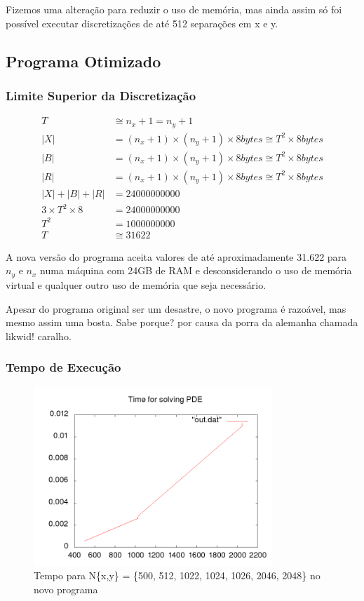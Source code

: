 \documentclass[12pt]{article}
\begin{document}
	Fizemos uma alteração para reduzir o uso de memória, mas ainda assim só foi possível executar discretizações de até 512 separações em x e y.
	
	\subsection{Programa Otimizado}
	\subsubsection{Limite Superior da Discretização}

	\begin{align}
		T &\cong n_x + 1 = n_y + 1 \\
		|X| &= (n_x+1)\times(n_y+1)\times8 bytes \cong T^2\times8 bytes \\
		|B| &= (n_x+1)\times(n_y+1)\times8 bytes \cong T^2\times8 bytes \\
		|R| &= (n_x+1)\times(n_y+1)\times8 bytes \cong T^2\times8 bytes \\
		|X| + |B| + |R| &= 24000000000 \\
		3\times T^2\times8 &= 24000000000 \\
		T^2 &= 1000000000\\
		T &\cong 31622
	\end{align}

	A nova versão do programa aceita valores de até aproximadamente 31.622 para $n_y$ e $n_x$ numa máquina com 24GB de 	RAM e desconsiderando o uso de memória virtual e qualquer outro uso de memória que seja necessário.
	
	Apesar do programa original ser um desastre, o novo programa é razoável, mas mesmo assim uma bosta. Sabe porque? por causa da porra da alemanha chamada likwid! caralho.
	
	\subsubsection{Tempo de Execução}
	\begin{figure}[ht!]
		\centering
		\includegraphics[width=90mm]{newtime.png}
		\caption{Tempo para N\{x,y\} = \{500, 512, 1022, 1024, 1026, 2046, 2048\} no novo programa
		\label{overflow}}
	\end{figure}
\newpage
\end{document}

